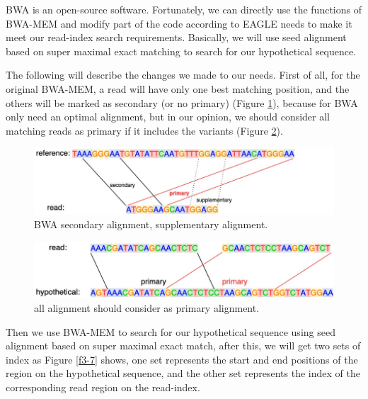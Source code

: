 BWA is an open-source software. Fortunately, we can directly use the functions of BWA-MEM and modify part of the code according to EAGLE needs to make it meet our read-index search requirements. Basically, we will use seed alignment based on super maximal exact matching to search for our hypothetical sequence.

The following will describe the changes we made to our needs. First of all, for the original BWA-MEM, a read will have only one best matching position, and the others will be marked as secondary (or no primary) (Figure \ref{f3-5}), because for BWA only need an optimal alignment, but in our opinion, we should consider all matching reads as primary if it includes the variants (Figure \ref{f3-6}). 

\vspace{1cm}
\begin{figure}[H]
    \centering
    \includegraphics[width=1\columnwidth]{body/image/3-5.png}
    \captionsetup{labelfont=bf}
    \renewcommand{\baselinestretch}{1.0}
    \vspace{-1cm}
    \caption[secondary alignment]{BWA secondary alignment, supplementary alignment.}
    \label{f3-5}
\end{figure}

\vspace{0.5cm}
\begin{figure}[H]
    \centering
    \includegraphics[width=1\columnwidth]{body/image/3-6.png}
    \captionsetup{labelfont=bf}
    \renewcommand{\baselinestretch}{1.0}
    \vspace{-1cm}
    \caption[primary alignment]{all alignment should consider as primary alignment.}
    \label{f3-6}
\end{figure}

Then we use BWA-MEM to search for our hypothetical sequence using seed alignment based on super maximal exact match, after this, we will get two sets of index as Figure \ref{f3-7} shows, one set represents the start and end positions of the region on the hypothetical sequence, and the other set represents the index of the corresponding read region on the read-index. 

